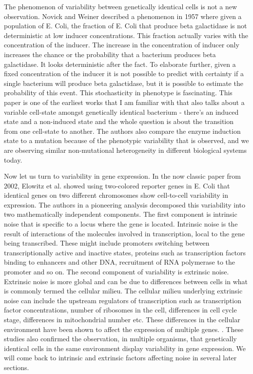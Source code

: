 The phenomenon of variability between genetically identical cells is not a new observation. Novick and Weiner \cite{novick_enzyme_1957} \cite{raj_nature_2008} described a phenomenon in 1957 where given a population of E. Coli, the fraction of E. Coli that produce beta galactidase is not deterministic at low inducer concentrations. This fraction actually varies with the concentration of the inducer. The increase in the concentration of inducer only increases the chance or the probability that a bacterium produces beta galactidase. It looks deterministic after the fact. To elaborate further, given a fixed concentration of the inducer it is not possible to predict with certainty if a single bacterium will produce beta galactidase, but it is possible to estimate the probability of this event. This stochasticity in phenotype is fascinating. This paper is one of the earliest works that I am familiar with that also talks about a variable cell-state amongst genetically identical bacterium - there's an induced state and a non-induced state and the whole question is about the transition from one cell-state to another. The authors also compare the enzyme induction state to a mutation because of the phenotypic variability that is observed, and we are observing similar non-mutational heterogeneity in different biological systems today.

Now let us turn to variability in gene expression. In the now classic paper from 2002, Elowitz et al.  \cite{elowitz_stochastic_2002} showed using two-colored reporter genes in E. Coli that identical genes on two different chromosomes show cell-to-cell variability in expression. The authors in a pioneering analysis decomposed this variability into two mathematically independent components. The first component is intrinsic noise that is specific to a locus where the gene is located. Intrinsic noise is the result of interactions of the molecules involved in transcription, local to the gene being transcribed. These might include promoters switching between transcriptionally active and inactive states, proteins such as transcription factors binding to enhancers and other DNA, recruitment of RNA polymerase to the promoter and so on. The second component of variability is extrinsic noise. Extrinsic noise is more global and can be due to differences between cells in what is commonly termed the cellular milieu. The cellular milieu underlying extrinsic noise can include the upstream regulators of transcription such as transcription factor concentrations, number of ribosomes in the cell, differences in cell cycle stage, differences in mitochondrial number etc. These differences in the cellular environment have been shown to affect the expression of multiple genes. \cite{raser_control_2004,blake_phenotypic_2006,blake_noise_2003,raser_noise_2005,volfson_origins_2006}. These studies also confirmed the observation, in multiple organisms, that genetically identical cells in the same environment display variability in gene expression. We will come back to intrinsic and extrinsic factors affecting noise in several later sections.

